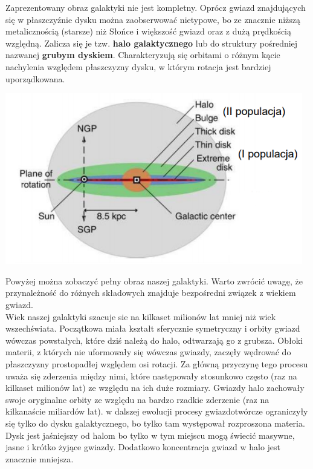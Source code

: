 \documentclass[../index.tex]{subfiles}
\begin{document}
        Zaprezentowany obraz galaktyki nie jest kompletny. Oprócz gwiazd znajdujących się w płaszczyźnie dysku można zaobserwować nietypowe, bo ze znacznie niższą metalicznością (starsze) niż Słońce i większość gwiazd oraz z dużą prędkością względną. Zalicza się je tzw. \textbf{halo galaktycznego} lub do struktury pośredniej nazwanej \textbf{grubym dyskiem}. Charakteryzują się orbitami o różnym kącie nachylenia względem płaszczyzny dysku, w którym rotacja jest bardziej uporządkowana.
        \begin{center}
            \includegraphics[width=13cm]{images/drogaMlecznaBudowa.png}
        \end{center}
        Powyżej można zobaczyć pełny obraz naszej galaktyki. Warto zwrócić uwagę, że przynależność do różnych składowych znajduje bezpośredni związek z wiekiem gwiazd.\\
        Wiek naszej galaktyki szacuje sie na kilkaset milionów lat mniej niż wiek wszechświata. Początkowa miała kształt sferycznie symetryczny i orbity gwiazd wówczas powstałych, które dziś należą do halo, odtwarzają go z grubsza. Obłoki materii, z których nie uformowały się wówczas gwiazdy, zaczęły wędrować do płaszczyzny prostopadłej względem osi rotacji. Za główną przyczynę tego procesu uważa się zderzenia między nimi, które następowały stosunkowo często (raz na kilkaset milionów lat) ze względu na ich duże rozmiary. Gwiazdy halo zachowały swoje oryginalne orbity ze względu na bardzo rzadkie zderzenie (raz na kilkanaście miliardów lat). w dalszej ewolucji procesy gwiazdotwórcze ograniczyły się tylko do dysku galaktycznego, bo tylko tam występował rozproszona materia. Dysk jest jaśniejszy od halom bo tylko w tym miejscu mogą świecić masywne, jasne i krótko żyjące gwiazdy. Dodatkowo koncentracja gwiazd w halo jest znacznie mniejsza.\\
\end{document}
